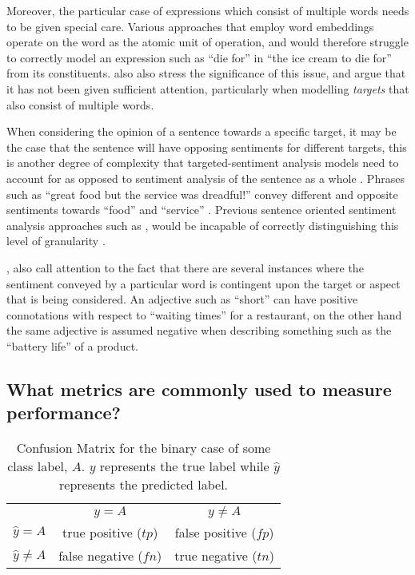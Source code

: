 \documentclass[../../fyp.tex]{subfiles}
\begin{document}
Moreover, the particular case of expressions which consist of multiple words needs to be given special care. Various approaches that employ word embeddings operate on the word as the atomic unit of operation, and would therefore struggle to correctly model an expression such as \enquote{die for} in \enquote{the ice cream to die for} \cite{tang2016} from its constituents. \cite{zheng2018} also also stress the significance of this issue, and argue that it has not been given sufficient attention, particularly when modelling \textit{targets} that also consist of multiple words.

When considering the opinion of a sentence towards a specific target, it may be the case that the sentence will have opposing sentiments for different targets, this is another degree of complexity that targeted-sentiment analysis models need to account for as opposed to sentiment analysis of the sentence as a whole \cite{tang}. Phrases such as \enquote{great food but the service was dreadful!} convey different and opposite sentiments towards \enquote{food} and \enquote{service} \cite{tang2016}. Previous sentence oriented sentiment analysis approaches such as \cite{socher2011}, \cite{appel2016} would be incapable of correctly distinguishing this level of granularity \cite{chen2017}.

\cite{dehongma2017}, \cite{wang2018} also call attention to the fact that there are several instances where the sentiment conveyed by a particular word is contingent upon the target or aspect that is being considered. An adjective such as \enquote{short} can have positive connotations with respect to \enquote{waiting times} for a restaurant, on the other hand the same adjective is assumed negative when describing something such as the \enquote{battery life} of a product.

\subsection{What metrics are commonly used to measure performance?}
\begin{table}[h!]
	\centering
	\begin{tabular}{||l c c||}
		\hline
		                 & $y=A$                 & $y\neq{A}$            \\ [0.5ex]
		$\hat{y}=A$      & true positive ($tp$)  & false positive ($fp$) \\
		$\hat{y}\neq{A}$ & false negative ($fn$) & true negative ($tn$)  \\
		\hline
	\end{tabular}
	\caption{Confusion Matrix for the binary case of some class label, $A$. $y$ represents the true label while $\hat{y}$ represents the predicted label.}
	\label{table:confusion_matrix}
\end{table}
\end{document}
